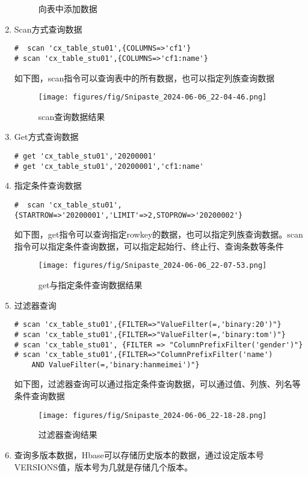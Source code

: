 \documentclass[12pt,hyperref,a4paper,UTF8]{ctexart}
\begin{document}
\begin{enumerate}
\begin{figure}[H]
        \caption{向表中添加数据}
        \label{fig:8}
    \end{figure} 
    \item Scan方式查询数据
    \begin{verbatim}
#  scan 'cx_table_stu01',{COLUMNS=>'cf1'}
# scan 'cx_table_stu01',{COLUMNS=>'cf1:name'}
    \end{verbatim}
    如下图，scan指令可以查询表中的所有数据，也可以指定列族查询数据
    \begin{figure}[H]
        \centering
        \texttt{[image: figures/fig/Snipaste\_2024-06-06\_22-04-46.png]}
        \caption{scan查询数据结果}
        \label{fig:8}
    \end{figure} 
    \item Get方式查询数据
    \begin{verbatim}
# get 'cx_table_stu01','20200001'
# get 'cx_table_stu01','20200001','cf1:name'
    \end{verbatim}
    \item 指定条件查询数据
    \begin{verbatim}
#  scan 'cx_table_stu01',{STARTROW=>'20200001','LIMIT'=>2,STOPROW=>'20200002'}
    \end{verbatim}
    如下图，get指令可以查询指定rowkey的数据，也可以指定列族查询数据。scan指令可以指定条件查询数据，可以指定起始行、终止行、查询条数等条件
    \begin{figure}[H]
        \centering
        \texttt{[image: figures/fig/Snipaste\_2024-06-06\_22-07-53.png]}
        \caption{get与指定条件查询数据结果}
        \label{fig:8}
    \end{figure} 
    \item 过滤器查询
    \begin{verbatim}
# scan 'cx_table_stu01',{FILTER=>"ValueFilter(=,'binary:20')"}
# scan 'cx_table_stu01',{FILTER=>"ValueFilter(=,'binary:tom')"}
# scan 'cx_table_stu01', {FILTER => "ColumnPrefixFilter('gender')"}
# scan 'cx_table_stu01',{FILTER=>"ColumnPrefixFilter('name') 
    AND ValueFilter(=,'binary:hanmeimei')"}
    \end{verbatim}    
    如下图，过滤器查询可以通过指定条件查询数据，可以通过值、列族、列名等条件查询数据
    \begin{figure}[H]
        \centering
        \texttt{[image: figures/fig/Snipaste\_2024-06-06\_22-18-28.png]}
        \caption{过滤器查询结果}
        \label{fig:8}
    \end{figure} 
    \item 查询多版本数据，Hbase可以存储历史版本的数据，通过设定版本号VERSIONS值，版本号为几就是存储几个版本。

\end{enumerate}
\end{document}
